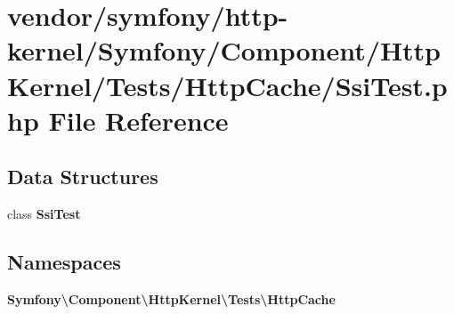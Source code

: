 \section{vendor/symfony/http-\/kernel/\+Symfony/\+Component/\+Http\+Kernel/\+Tests/\+Http\+Cache/\+Ssi\+Test.php File Reference}
\label{_ssi_test_8php}
\subsection*{Data Structures}
\begin{DoxyCompactItemize}
\item 
class {\bf Ssi\+Test}
\end{DoxyCompactItemize}
\subsection*{Namespaces}
\begin{DoxyCompactItemize}
\item 
 {\bf Symfony\textbackslash{}\+Component\textbackslash{}\+Http\+Kernel\textbackslash{}\+Tests\textbackslash{}\+Http\+Cache}
\end{DoxyCompactItemize}
